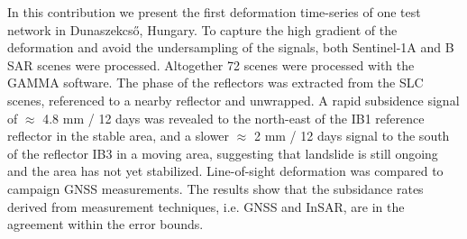 \documentclass[a0, 18pt, landscape]{a0poster}
\begin{document}
\begin{mdframed}
\begin{multicols}{2}
In this contribution we present the first deformation time-series of one test network in Dunaszekcső, Hungary. To capture the high gradient of the deformation and avoid the undersampling of the signals, both Sentinel-1A and B SAR scenes were processed. Altogether 72 scenes were processed with the GAMMA software. The phase of the reflectors was extracted from the SLC scenes, referenced to a nearby reflector and unwrapped. A rapid subsidence signal of $\approx$ 4.8 mm / 12 days was revealed to the north-east of the IB1 reference reflector in the stable area, and a slower $\approx$ 2 mm / 12 days signal to the south of the reflector IB3 in a moving area, suggesting that landslide is still ongoing and the area has not yet stabilized. Line-of-sight deformation was compared to campaign GNSS measurements. The results show that the subsidance rates derived from measurement techniques, i.e. GNSS and InSAR, are in the agreement within the error bounds.

\end{multicols}

\end{mdframed}


\normalfont\bfseries
\end{document}
